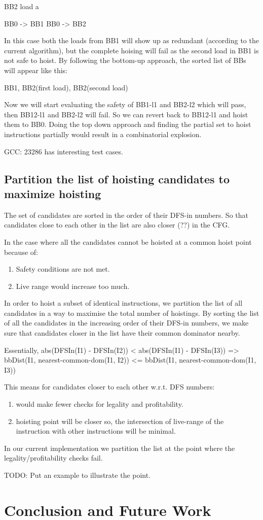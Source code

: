 \documentclass{sig-alternate}
\begin{document}
BB2
load a

BB0 -> BB1
BB0 -> BB2

In this case both the loads from BB1 will show up as redundant
(according to the current algorithm), but the complete hoising will
fail as the second load in BB1 is not safe to hoist. By following the
bottom-up approach, the sorted list of BBs will appear like this:

{ BB1, BB2(first load), BB2(second load) }

Now we will start evaluating the safety of BB1-l1 and BB2-l2 which
will pass, then BB12-l1 and BB2-l2 will fail.  So we can revert back
to BB12-l1 and hoist them to BB0. Doing the top down approach and
finding the partial set to hoist instructions partially would result
in a combinatorial explosion.

GCC: 23286 has interesting test cases.

\subsection{Partition the list of hoisting candidates to maximize hoisting}
\label{subsec:partition}
The set of candidates are sorted in the order of their DFS-in
numbers. So that candidates close to each other in the list are also
closer (??) in the CFG.

In the case where all the candidates cannot be hoisted at a common
hoist point because of:
\begin{enumerate}
\item Safety conditions are not met.
\item Live range would increase too much.
\end{enumerate}

In order to hoist a subset of identical instructions, we partition the
list of all candidates in a way to maximise the total number of
hoistings.  By sorting the list of all the candidates in the
increasing order of their DFS-in numbers, we make sure that candidates
closer in the list have their common dominator nearby.

Essentially,
abs(DFSIn(I1) - DFSIn(I2)) < abs(DFSIn(I1) - DFSIn(I3))
=> bbDist(I1, nearest-common-dom(I1, I2)) <= bbDist(I1, nearest-common-dom(I1, I3))

This means for candidates closer to each other w.r.t. DFS numbers:
\begin{enumerate}
\item would make fewer checks for legality and profitability.
\item hoisting point will be closer so, the intersection of live-range of the
  instruction with other instructions will be minimal.
\end{enumerate}

In our current implementation we partition the list at the point where the
legality/profitability checks fail.

TODO: Put an example to illustrate the point.


\section{Conclusion and Future Work}


{\small

}
\end{document}
